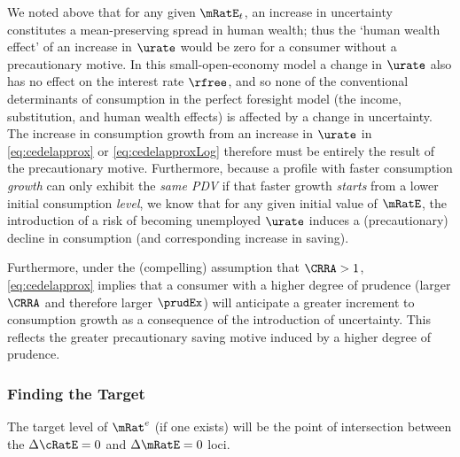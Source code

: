 \documentclass{\handout}
\begin{document}
We noted above that for any given $\mRatE_{t}$, an increase in uncertainty constitutes a mean-preserving spread in human wealth; thus the `human wealth effect' of an increase in $\urate$ would be zero for a consumer without a precautionary motive.  In this small-open-economy model a change in $\urate$ also has no effect on the interest rate $\rfree$, and so none of the conventional determinants of consumption in the perfect foresight model (the income, substitution, and human wealth effects) is affected by a change in uncertainty.  The increase in consumption growth from an increase in $\urate$ in \eqref{eq:cedelapprox} or \eqref{eq:cedelapproxLog} therefore must be entirely the result of the precautionary motive.  Furthermore, because a profile with faster consumption {\it growth} can only exhibit the {\it same PDV} if that faster growth {\it starts} from a lower initial consumption {\it level}, we know that for any given initial value of $\mRatE$, the introduction of a risk of becoming unemployed $\urate$ induces a (precautionary) decline in consumption (and corresponding increase in saving).

Furthermore, under the (compelling) assumption that $\CRRA > 1$, \eqref{eq:cedelapprox} implies that a consumer with
a higher degree of prudence (larger $\CRRA$ and therefore larger $\prudEx$) will
anticipate a greater increment to consumption growth as a consequence of the introduction of uncertainty.  This reflects the greater precautionary
saving motive induced by a higher degree of prudence.



\subsubsection{Finding the Target}

The target level of $\mRat^{e}$ (if one exists) will be the point of intersection between the $\dcEqZero$ and $\dmEqZero$ loci.  
\end{document}
